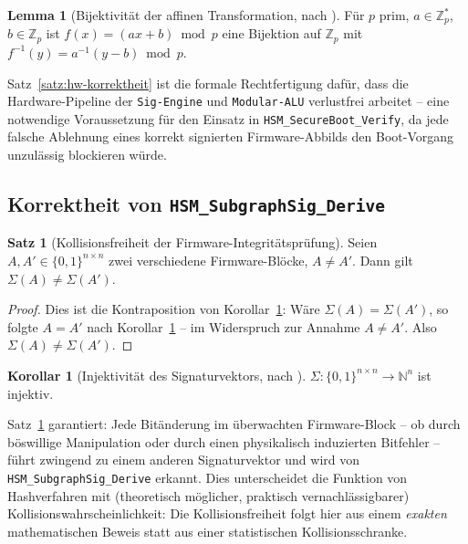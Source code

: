 ﻿\documentclass[a4paper,12pt]{article}
\theoremstyle{definition}
\newtheorem{satz}{Satz}
\newtheorem{lemma}{Lemma}
\newtheorem{korollar}{Korollar}
\begin{document}
\begin{lemma}[Bijektivität der affinen Transformation, nach \cite{Epp26b}]
	\label{lem:affin-bij-hw}
	Für $p$ prim, $a \in \mathbb{Z}_p^*$, $b \in \mathbb{Z}_p$ ist $f(x)=(ax+b)\bmod p$ eine Bijektion auf $\mathbb{Z}_p$ mit $f^{-1}(y)=a^{-1}(y-b)\bmod p$.
\end{lemma}

Satz~\ref{satz:hw-korrektheit} ist die formale Rechtfertigung dafür, dass die Hardware-Pipeline der \texttt{Sig-Engine} und \texttt{Modular-ALU} verlustfrei arbeitet -- eine notwendige Voraussetzung für den Einsatz in \texttt{HSM\_SecureBoot\_Verify}, da jede falsche Ablehnung eines korrekt signierten Firmware-Abbilds den Boot-Vorgang unzulässig blockieren würde.

\subsection{Korrektheit von \texttt{HSM\_SubgraphSig\_Derive}}

\begin{satz}[Kollisionsfreiheit der Firmware-Integritätsprüfung]
	\label{satz:kollisionsfrei}
	Seien $A, A' \in \{0,1\}^{n\times n}$ zwei verschiedene Firmware-Blöcke, $A \ne A'$. Dann gilt $\Sigma(A) \ne \Sigma(A')$.
\end{satz}

\begin{proof}
	Dies ist die Kontraposition von Korollar~\ref{kor:sigma-inj-hw}: Wäre $\Sigma(A) = \Sigma(A')$, so folgte $A = A'$ nach Korollar~\ref{kor:sigma-inj-hw} -- im Widerspruch zur Annahme $A \ne A'$. Also $\Sigma(A) \ne \Sigma(A')$. \qedhere
\end{proof}

\begin{korollar}[Injektivität des Signaturvektors, nach \cite{Epp26a,Epp26b}]
	\label{kor:sigma-inj-hw}
	$\Sigma: \{0,1\}^{n\times n} \to \mathbb{N}^n$ ist injektiv.
\end{korollar}

Satz~\ref{satz:kollisionsfrei} garantiert: Jede Bitänderung im überwachten Firmware-Block -- ob durch böswillige Manipulation oder durch einen physikalisch induzierten Bitfehler -- führt zwingend zu einem anderen Signaturvektor und wird von \texttt{HSM\_SubgraphSig\_Derive} erkannt. Dies unterscheidet die Funktion von Hashverfahren mit (theoretisch möglicher, praktisch vernachlässigbarer) Kollisionswahrscheinlichkeit: Die Kollisionsfreiheit folgt hier aus einem \emph{exakten} mathematischen Beweis statt aus einer statistischen Kollisionsschranke.
\end{document}
